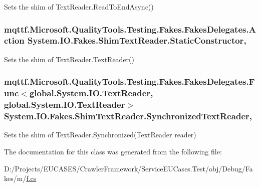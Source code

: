 Sets the shim of Text\-Reader.\-Read\-To\-End\-Async()

\hypertarget{class_system_1_1_i_o_1_1_fakes_1_1_shim_text_reader_a6ff78ff4fb602622cf664c9ce92a5a85}{
\subsubsection[{Static\-Constructor}]{\setlength{\rightskip}{0pt plus 5cm}mqttf.\-Microsoft.\-Quality\-Tools.\-Testing.\-Fakes.\-Fakes\-Delegates.\-Action System.\-I\-O.\-Fakes.\-Shim\-Text\-Reader.\-Static\-Constructor\hspace{0.3cm}{\ttfamily [static]}, {\ttfamily [set]}}}\label{class_system_1_1_i_o_1_1_fakes_1_1_shim_text_reader_a6ff78ff4fb602622cf664c9ce92a5a85}


Sets the shim of Text\-Reader.\-Text\-Reader()

\hypertarget{class_system_1_1_i_o_1_1_fakes_1_1_shim_text_reader_a92ffb0591d06aa68c27bc3457ca02cd3}{
\subsubsection[{Synchronized\-Text\-Reader}]{\setlength{\rightskip}{0pt plus 5cm}mqttf.\-Microsoft.\-Quality\-Tools.\-Testing.\-Fakes.\-Fakes\-Delegates.\-Func$<$global.\-System.\-I\-O.\-Text\-Reader, global.\-System.\-I\-O.\-Text\-Reader$>$ System.\-I\-O.\-Fakes.\-Shim\-Text\-Reader.\-Synchronized\-Text\-Reader\hspace{0.3cm}{\ttfamily [static]}, {\ttfamily [set]}}}\label{class_system_1_1_i_o_1_1_fakes_1_1_shim_text_reader_a92ffb0591d06aa68c27bc3457ca02cd3}


Sets the shim of Text\-Reader.\-Synchronized(\-Text\-Reader reader)



The documentation for this class was generated from the following file\-:\begin{DoxyCompactItemize}
\item 
D\-:/\-Projects/\-E\-U\-C\-A\-S\-E\-S/\-Crawler\-Framework/\-Service\-E\-U\-Cases.\-Test/obj/\-Debug/\-Fakes/m/\hyperlink{m_2f_8cs}{f.\-cs}\end{DoxyCompactItemize}
